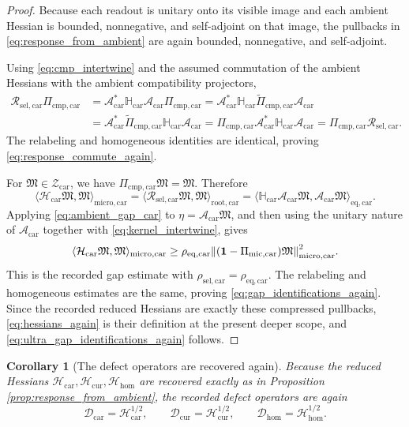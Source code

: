 \documentclass[11pt]{article}
\newcommand{\UltraTensorClass}{\mathscr Z_{\mathrm{car}}}
\newcommand{\UltraTensor}{\mathfrak M}
\newcommand{\UltraCarProj}{\Pi_{\mathrm{mic,car}}}
\newcommand{\TensorDefect}{\mathcal D_{\mathrm{car}}}
\newcommand{\CurDefect}{\mathcal D_{\mathrm{cur}}}
\newcommand{\HomDefect}{\mathcal D_{\mathrm{hom}}}
\newcommand{\TensorHess}{\mathcal H_{\mathrm{car}}}
\newcommand{\CurHess}{\mathcal H_{\mathrm{cur}}}
\newcommand{\HomHess}{\mathcal H_{\mathrm{hom}}}
\newcommand{\TensorCmpProj}{\Pi_{\mathrm{cmp,car}}}
\newcommand{\TensorResp}{\mathcal R_{\mathrm{sel,car}}}
\newcommand{\StemCarGap}{\rho_{\mathrm{sel,car}}}
\newcommand{\TensorEqRead}{\mathcal A_{\mathrm{car}}}
\newcommand{\TensorAmbientHess}{\mathbb H_{\mathrm{car}}}
\newcommand{\TensorEqCmpProj}{\widetilde\Pi_{\mathrm{cmp,car}}}
\newcommand{\EqCarGap}{\rho_{\mathrm{eq,car}}}
\newtheorem{corollary}{Corollary}
\begin{document}
\begin{proof}
Because each readout is unitary onto its visible image and each ambient Hessian is bounded, nonnegative, and self-adjoint on that image, the pullbacks in \eqref{eq:response_from_ambient} are again bounded, nonnegative, and self-adjoint.

Using \eqref{eq:cmp_intertwine} and the assumed commutation of the ambient Hessians with the ambient compatibility projectors,
\[
\begin{aligned}
\TensorResp\TensorCmpProj
&=
\TensorEqRead^*\TensorAmbientHess\TensorEqRead\TensorCmpProj
=
\TensorEqRead^*\TensorAmbientHess\TensorEqCmpProj\TensorEqRead
\\
&=
\TensorEqRead^*\TensorEqCmpProj\TensorAmbientHess\TensorEqRead
=
\TensorCmpProj\TensorEqRead^*\TensorAmbientHess\TensorEqRead
=
\TensorCmpProj\TensorResp.
\end{aligned}
\]
The relabeling and homogeneous identities are identical, proving \eqref{eq:response_commute_again}.

For \(\UltraTensor\in\UltraTensorClass\), we have \(\TensorCmpProj\UltraTensor=\UltraTensor\). Therefore
\[
\langle \TensorHess\UltraTensor,\UltraTensor\rangle_{\mathrm{micro,car}}
=
\langle \TensorResp\UltraTensor,\UltraTensor\rangle_{\mathrm{root,car}}
=
\langle \TensorAmbientHess\TensorEqRead\UltraTensor,\TensorEqRead\UltraTensor\rangle_{\mathrm{eq,car}}.
\]
Applying \eqref{eq:ambient_gap_car} to \(\eta=\TensorEqRead\UltraTensor\), and then using the unitary nature of \(\TensorEqRead\) together with \eqref{eq:kernel_intertwine}, gives
\[
\langle \TensorHess\UltraTensor,\UltraTensor\rangle_{\mathrm{micro,car}}
\ge
\EqCarGap\norm{(\mathbf 1-\UltraCarProj)\UltraTensor}_{\mathrm{micro,car}}^2.
\]
This is the recorded gap estimate with \(\StemCarGap=\EqCarGap\). The relabeling and homogeneous estimates are the same, proving \eqref{eq:gap_identifications_again}. Since the recorded reduced Hessians are exactly these compressed pullbacks, \eqref{eq:hessians_again} is their definition at the present deeper scope, and \eqref{eq:ultra_gap_identifications_again} follows.
\end{proof}

\begin{corollary}[The defect operators are recovered again]
\label{cor:defects_again}
Because the reduced Hessians \(\TensorHess,\CurHess,\HomHess\) are recovered exactly as in Proposition \ref{prop:response_from_ambient}, the recorded defect operators are again
\begin{equation}
\TensorDefect=\TensorHess^{1/2},
\qquad
\CurDefect=\CurHess^{1/2},
\qquad
\HomDefect=\HomHess^{1/2}.
\label{eq:defects_again_here}
\end{equation}
\end{corollary}
\end{document}
